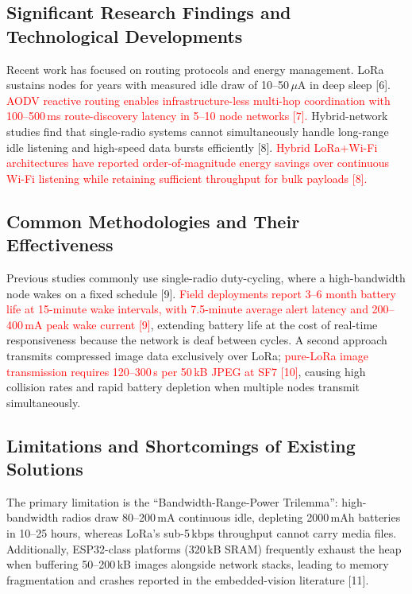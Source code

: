 \documentclass[12pt,a4paper]{article}
\newcommand{\changed}[1]{\textcolor{red}{#1}}
\begin{document}
\subsection{Significant Research Findings and Technological Developments}

Recent work has focused on routing protocols and energy management. LoRa sustains nodes for years with measured idle draw of 10--50\,$\mu$A in deep sleep [6]. \changed{AODV reactive routing enables infrastructure-less multi-hop coordination with 100--500\,ms route-discovery latency in 5--10 node networks [7].} Hybrid-network studies find that single-radio systems cannot simultaneously handle long-range idle listening and high-speed data bursts efficiently [8]. \changed{Hybrid LoRa+Wi-Fi architectures have reported order-of-magnitude energy savings over continuous Wi-Fi listening while retaining sufficient throughput for bulk payloads [8].}

\subsection{Common Methodologies and Their Effectiveness}

Previous studies commonly use single-radio duty-cycling, where a high-bandwidth node wakes on a fixed schedule [9]. \changed{Field deployments report 3--6 month battery life at 15-minute wake intervals, with 7.5-minute average alert latency and 200--400\,mA peak wake current [9]}, extending battery life at the cost of real-time responsiveness because the network is deaf between cycles. A second approach transmits compressed image data exclusively over LoRa; \changed{pure-LoRa image transmission requires 120--300\,s per 50\,kB JPEG at SF7 [10]}, causing high collision rates and rapid battery depletion when multiple nodes transmit simultaneously.

\subsection{Limitations and Shortcomings of Existing Solutions}

The primary limitation is the ``Bandwidth-Range-Power Trilemma'': high-bandwidth radios draw 80--200\,mA continuous idle, depleting 2000\,mAh batteries in 10--25 hours, whereas LoRa's sub-5\,kbps throughput cannot carry media files. Additionally, ESP32-class platforms (320\,kB SRAM) frequently exhaust the heap when buffering 50--200\,kB images alongside network stacks, leading to memory fragmentation and crashes reported in the embedded-vision literature [11].
\end{document}
